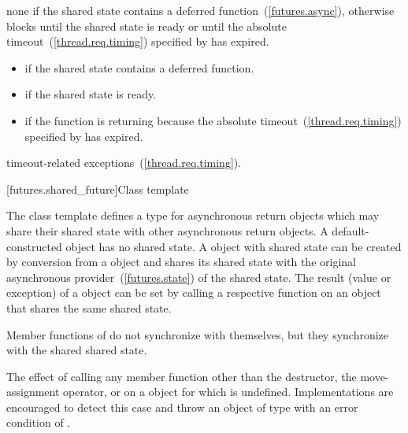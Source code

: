 \begin{itemdescr}
\pnum
\effects
none if the shared state contains a deferred function~(\ref{futures.async}),
otherwise
blocks until the shared state is ready or until
the absolute timeout~(\ref{thread.req.timing}) specified by  has expired.

\pnum
\returns

\begin{itemize}
\item {} if the shared state contains a deferred
function.

\item {} if the shared state is ready.

\item {} if the function is returning because the
absolute timeout~(\ref{thread.req.timing})
specified by  has expired.
\end{itemize}

\pnum
\throws
timeout-related exceptions~(\ref{thread.req.timing}).
\end{itemdescr}


[futures.shared_future]{Class template }

\pnum
The class template  defines a type for asynchronous return objects
which may share their shared state with other asynchronous return
objects. A default-constructed 
object has no shared state. A  object with
shared state can
be created
by conversion from a  object and shares its shared state with the
original asynchronous provider~(\ref{futures.state}) of the shared state.
The result (value or exception) of a  object
can be set by
calling a respective function on an
object that shares the same shared state.

\pnum
\enternote Member functions of  do not synchronize with themselves,
but they synchronize with the shared shared state. \exitnote

\pnum
The effect of calling any member function other than the destructor, the move-assignment
operator, or  on a  object for which  is undefined.
\enternote Implementations are encouraged to detect this case and throw an object of type
 with an error condition of . \exitnote


